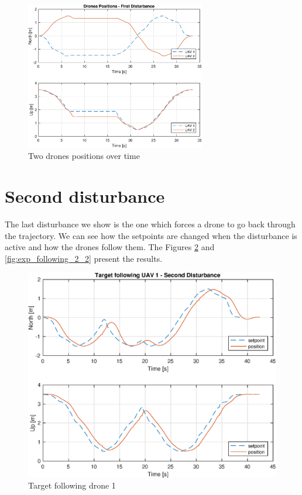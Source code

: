 \begin{figure}
\centering
\includegraphics[width=0.7\textwidth]{chapters/chapter-05/figures/overlapped_1.eps}
\caption{Two drones positions over time}
\label{fig:exp_overlapped_1}
\end{figure}

\section{Second disturbance}
The last disturbance we show is the one which forces a drone to go back through the
trajectory. We can see how the setpoints are changed when the disturbance is active
and how the drones follow them. The Figures \ref{fig:exp_following_1_2}
and \ref{fig:exp_following_2_2} present the results.

\begin{figure}
\centering
\includegraphics[width=0.7\linewidth]{chapters/chapter-05/figures/following_1_2.eps}
\caption{Target following drone 1}
\label{fig:exp_following_1_2}
\end{figure}

